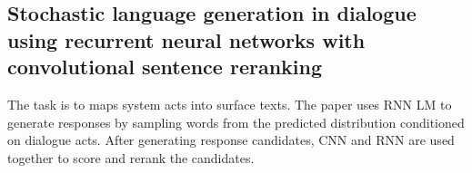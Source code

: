 \subsection{Stochastic language generation in dialogue using recurrent neural networks with convolutional sentence reranking \cite{Wen2015a}}

The task is to maps system acts into surface texts. The paper uses RNN LM to generate responses by sampling words from the predicted distribution conditioned on dialogue acts. After generating response candidates, CNN and RNN are used together to score and rerank the candidates. 